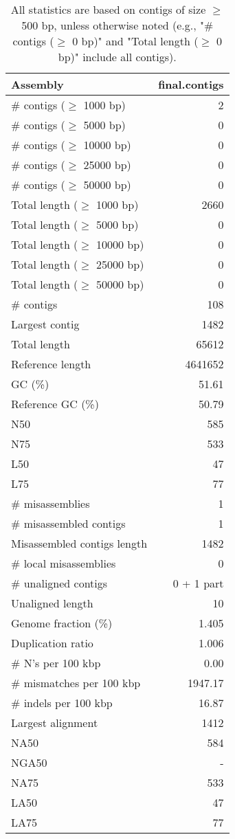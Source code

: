 \documentclass[12pt,a4paper]{article}
\begin{document}
\begin{table}[ht]
\begin{center}
\caption{All statistics are based on contigs of size $\geq$ 500 bp, unless otherwise noted (e.g., "\# contigs ($\geq$ 0 bp)" and "Total length ($\geq$ 0 bp)" include all contigs).}
\begin{tabular}{|l*{1}{|r}|}
\hline
Assembly & final.contigs \\ \hline
\# contigs ($\geq$ 1000 bp) & 2 \\ \hline
\# contigs ($\geq$ 5000 bp) & 0 \\ \hline
\# contigs ($\geq$ 10000 bp) & 0 \\ \hline
\# contigs ($\geq$ 25000 bp) & 0 \\ \hline
\# contigs ($\geq$ 50000 bp) & 0 \\ \hline
Total length ($\geq$ 1000 bp) & 2660 \\ \hline
Total length ($\geq$ 5000 bp) & 0 \\ \hline
Total length ($\geq$ 10000 bp) & 0 \\ \hline
Total length ($\geq$ 25000 bp) & 0 \\ \hline
Total length ($\geq$ 50000 bp) & 0 \\ \hline
\# contigs & 108 \\ \hline
Largest contig & 1482 \\ \hline
Total length & 65612 \\ \hline
Reference length & 4641652 \\ \hline
GC (\%) & 51.61 \\ \hline
Reference GC (\%) & 50.79 \\ \hline
N50 & 585 \\ \hline
N75 & 533 \\ \hline
L50 & 47 \\ \hline
L75 & 77 \\ \hline
\# misassemblies & 1 \\ \hline
\# misassembled contigs & 1 \\ \hline
Misassembled contigs length & 1482 \\ \hline
\# local misassemblies & 0 \\ \hline
\# unaligned contigs & 0 + 1 part \\ \hline
Unaligned length & 10 \\ \hline
Genome fraction (\%) & 1.405 \\ \hline
Duplication ratio & 1.006 \\ \hline
\# N's per 100 kbp & 0.00 \\ \hline
\# mismatches per 100 kbp & 1947.17 \\ \hline
\# indels per 100 kbp & 16.87 \\ \hline
Largest alignment & 1412 \\ \hline
NA50 & 584 \\ \hline
NGA50 & - \\ \hline
NA75 & 533 \\ \hline
LA50 & 47 \\ \hline
LA75 & 77 \\ \hline
\end{tabular}
\end{center}
\end{table}
\end{document}
